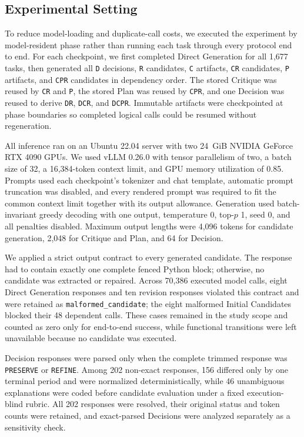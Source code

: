 \subsection{Experimental Setting}

To reduce model-loading and duplicate-call costs, we executed the experiment by model-resident phase rather than running each task through every protocol end to end.
For each checkpoint, we first completed Direct Generation for all 1,677 tasks, then generated all \texttt{D} decisions, \texttt{R} candidates, \texttt{C} artifacts, \texttt{CR} candidates, \texttt{P} artifacts, and \texttt{CPR} candidates in dependency order.
The stored Critique was reused by \texttt{CR} and \texttt{P}, the stored Plan was reused by \texttt{CPR}, and one Decision was reused to derive \texttt{DR}, \texttt{DCR}, and \texttt{DCPR}.
Immutable artifacts were checkpointed at phase boundaries so completed logical calls could be resumed without regeneration.

All inference ran on an Ubuntu 22.04 server with two 24~GiB NVIDIA GeForce RTX 4090 GPUs.
We used vLLM 0.26.0 with tensor parallelism of two, a batch size of 32, a 16,384-token context limit, and GPU memory utilization of 0.85.
Prompts used each checkpoint's tokenizer and chat template, automatic prompt truncation was disabled, and every rendered prompt was required to fit the common context limit together with its output allowance.
Generation used batch-invariant greedy decoding with one output, temperature 0, top-$p$ 1, seed 0, and all penalties disabled.
Maximum output lengths were 4,096 tokens for candidate generation, 2,048 for Critique and Plan, and 64 for Decision.

We applied a strict output contract to every generated candidate.
The response had to contain exactly one complete fenced Python block; otherwise, no candidate was extracted or repaired.
Across 70,386 executed model calls, eight Direct Generation responses and ten revision responses violated this contract and were retained as \texttt{malformed\_candidate}; the eight malformed Initial Candidates blocked their 48 dependent calls.
These cases remained in the study scope and counted as zero only for end-to-end success, while functional transitions were left unavailable because no candidate was executed.

Decision responses were parsed only when the complete trimmed response was \texttt{PRESERVE} or \texttt{REFINE}.
Among 202 non-exact responses, 156 differed only by one terminal period and were normalized deterministically, while 46 unambiguous explanations were coded before candidate evaluation under a fixed execution-blind rubric.
All 202 responses were resolved, their original status and token counts were retained, and exact-parsed Decisions were analyzed separately as a sensitivity check.

